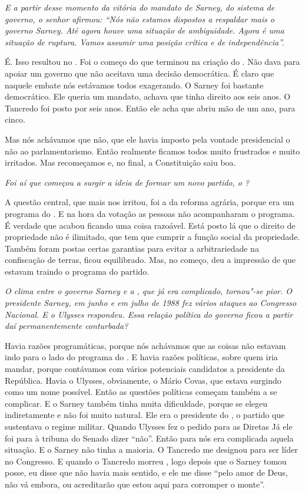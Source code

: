 \medskip

\emph{E a partir desse momento da vitória do mandato de Sarney, do
sistema de governo, o senhor afirmou: ``Nós não estamos dispostos a
respaldar mais o governo Sarney. Até agora houve uma situação de
ambiguidade. Agora é uma situação de ruptura. Vamos assumir uma posição
crítica e de independência''.}

É. Isso resultou no . Foi o começo do que terminou na
criação do . Não dava para apoiar um governo que não aceitava uma
decisão democrática. É claro que naquele embate nós estávamos todos
exagerando. O Sarney foi bastante democrático. Ele queria um mandato,
achava que tinha direito aos seis anos. O Tancredo foi posto por seis
anos. Então ele acha que abriu mão de um ano, para cinco.

Mas nós achávamos que não, que ele havia imposto pela vontade
presidencial o não ao parlamentarismo. Então realmente ficamos todos
muito frustrados e muito irritados. Mas recomeçamos e, no final, a
Constituição saiu boa.

\medskip

\emph{Foi aí que começou a surgir a ideia de formar um novo partido, o
?}

A questão central, que mais nos irritou, foi a da reforma
agrária, porque era um programa do . E na hora da votação as pessoas
não acompanharam o programa. É verdade que acabou ficando uma coisa
razoável. Está posto lá que o direito de propriedade não é ilimitado,
que tem que cumprir a função social da propriedade. Também foram postas
certas garantias para evitar a arbitrariedade na confiscação de terras,
ficou equilibrado. Mas, no começo, deu a impressão de que estavam
traindo o programa do partido.

\medskip

\emph{O clima entre o governo Sarney e a , que já era complicado,
tornou"-se pior. O presidente Sarney, em junho e em julho de 1988 fez
vários ataques ao Congresso Nacional. E o Ulysses respondeu. Essa
relação política do governo ficou a partir daí permanentemente
conturbada?}

Havia razões programáticas, porque nós achávamos que as
coisas não estavam indo para o lado do programa do . E havia razões
políticas, sobre quem iria mandar, porque contávamos com vários
potenciais candidatos a presidente da República. Havia o Ulysses,
obviamente, o Mário Covas, que estava surgindo como um nome possível.
Então as questões políticas começam também a se complicar. E o Sarney
também tinha muita dificuldade, porque se elegeu indiretamente e não foi
muito natural. Ele era o presidente do , o partido que sustentava o
regime militar. Quando Ulysses fez o pedido para as Diretas Já ele foi
para à tribuna do Senado dizer ``não''. Então para nós era complicada
aquela situação. E o Sarney não tinha a maioria. O Tancredo me designou
para ser líder no Congresso. E quando o Tancredo morreu , logo depois
que o Sarney tomou posse, eu disse que não havia mais sentido, e ele me
disse ``pelo amor de Deus, não vá embora, ou acreditarão que estou aqui
para corromper o monte''.

